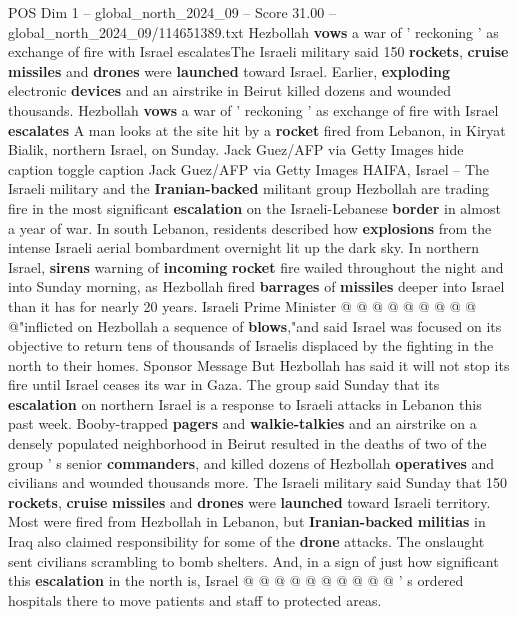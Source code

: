\begin{textsample}{POS Dim 1 – global\_north\_2024\_09 – Score 31.00 – global\_north\_2024\_09/114651389.txt}  \label{ex:f1_pos_092}
Hezbollah \textbf{vows} a war of ' reckoning ' as exchange of fire with Israel escalatesThe Israeli military said 150 \textbf{rockets}, \textbf{cruise} \textbf{missiles} and \textbf{drones} were \textbf{launched} toward Israel.
Earlier, \textbf{exploding} electronic \textbf{devices} and an airstrike in Beirut killed dozens and wounded thousands.
Hezbollah \textbf{vows} a war of ' reckoning ' as exchange of fire with Israel \textbf{escalates} A man looks at the site hit by a \textbf{rocket} fired from Lebanon, in Kiryat Bialik, northern Israel, on Sunday.
Jack Guez/AFP via Getty Images hide caption toggle caption Jack Guez/AFP via Getty Images HAIFA, Israel -- The Israeli military and the \textbf{Iranian-backed} militant group Hezbollah are trading fire in the most significant \textbf{escalation} on the Israeli-Lebanese \textbf{border} in almost a year of war.
In south Lebanon, residents described how \textbf{explosions} from the intense Israeli aerial bombardment overnight lit up the dark sky.
In northern Israel, \textbf{sirens} warning of \textbf{incoming} \textbf{rocket} fire wailed throughout the night and into Sunday morning, as Hezbollah fired \textbf{barrages} of \textbf{missiles} deeper into Israel than it has for nearly 20 years.
Israeli Prime Minister @ @ @ @ @ @ @ @ @ @"inflicted on Hezbollah a sequence of \textbf{blows},"and said Israel was focused on its objective to return tens of thousands of Israelis displaced by the fighting in the north to their homes.
Sponsor Message But Hezbollah has said it will not stop its fire until Israel ceases its war in Gaza.
The group said Sunday that its \textbf{escalation} on northern Israel is a response to Israeli attacks in Lebanon this past week.
Booby-trapped \textbf{pagers} and \textbf{walkie-talkies} and an airstrike on a densely populated neighborhood in Beirut resulted in the deaths of two of the group ' s senior \textbf{commanders}, and killed dozens of Hezbollah \textbf{operatives} and civilians and wounded thousands more.
The Israeli military said Sunday that 150 \textbf{rockets}, \textbf{cruise} \textbf{missiles} and \textbf{drones} were \textbf{launched} toward Israeli territory.
Most were fired from Hezbollah in Lebanon, but \textbf{Iranian-backed} \textbf{militias} in Iraq also claimed responsibility for some of the \textbf{drone} attacks.
The onslaught sent civilians scrambling to bomb shelters.
And, in a sign of just how significant this \textbf{escalation} in the north is, Israel @ @ @ @ @ @ @ @ @ @ ' s ordered hospitals there to move patients and staff to protected areas.

\end{textsample}
